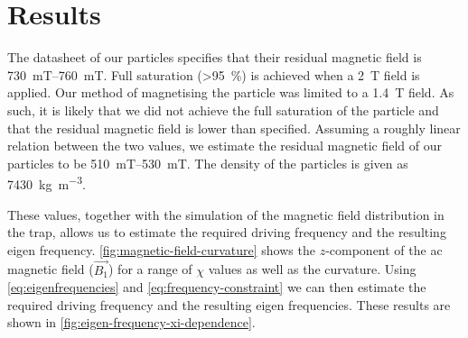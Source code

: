 \chapter{Results}
\label{chap:results}
The datasheet of our  particles specifies that their residual magnetic field is \qtyrange{730}{760}{\milli\tesla}. Full saturation (\qty{>95}{\percent}) is achieved when a \qty{2}{\tesla} field is applied. Our method of magnetising the particle was limited to a \qty{1.4}{\tesla} field. As such, it is likely that we did not achieve the full saturation of the particle and that the residual magnetic field is lower than specified. Assuming a roughly linear relation between the two values, we estimate the residual magnetic field of our particles to be \qtyrange{510}{530}{\milli\tesla}. The density of the particles is given as \qty{7430}{\kilo\gram\per\cubic\meter}.

These values, together with the simulation of the magnetic field distribution in the trap, allows us to estimate the required driving frequency and the resulting eigen frequency. \autoref{fig:magnetic-field-curvature} shows the $z$-component of the ac magnetic field ($\vec{B_1}$) for a range of $\chi$ values as well as the curvature. Using \autoref{eq:eigenfrequencies} and \autoref{eq:frequency-constraint} we can then estimate the required driving frequency and the resulting eigen frequencies. These results are shown in \autoref{fig:eigen-frequency-xi-dependence}.

